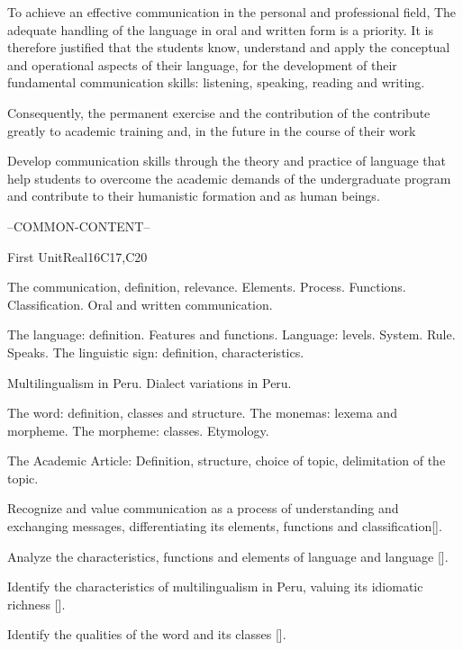 \begin{syllabus}


\begin{justification}
   To achieve an effective communication in the personal and professional field, 
   The adequate handling of the language in oral and written form is a priority. 
   It is therefore justified that the students know, understand and apply 
   the conceptual and operational aspects of their language, for the development 
   of their fundamental communication skills: listening, speaking, reading and writing.

   Consequently, the permanent exercise and the contribution of the contribute greatly 
   to academic training and, in the future in the course of their work
\end{justification}

\begin{goals}
\item Develop communication skills through the theory and practice of language that help students to overcome the academic demands of the undergraduate program and contribute to their humanistic formation and as human beings.
\end{goals}

--COMMON-CONTENT--

\begin{unit}{}{First Unit}{Real}{16}{C17,C20}
\begin{topics}
      \item The communication, definition, relevance. Elements. Process. Functions. Classification. Oral and written communication.
      \item The language: definition. Features and functions. Language: levels. System. Rule. Speaks. The linguistic sign: definition, characteristics.
      \item Multilingualism in Peru. Dialect variations in Peru.
      \item The word: definition, classes and structure. The monemas: lexema and morpheme. The morpheme: classes. Etymology.
      \item The Academic Article: Definition, structure, choice of topic, delimitation of the topic.
\end{topics}

\begin{learningoutcomes}
   \item Recognize and value communication as a process of understanding and exchanging messages, differentiating its elements, functions and classification[\Usage].
   \item Analyze the characteristics, functions and elements of language and language [\Usage].
   \item Identify the characteristics of multilingualism in Peru, valuing its idiomatic richness [\Usage].
   \item Identify the qualities of the word and its classes [\Usage].
\end{learningoutcomes}
\end{unit}


\end{syllabus}
